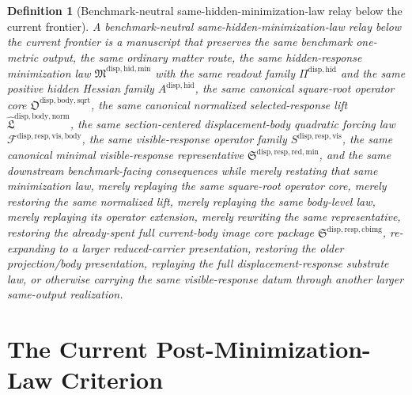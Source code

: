 \documentclass[11pt]{article}
\newcommand{\HiddenMinimizationPackage}{\mathfrak M^{\mathrm{disp,hid,min}}}
\newcommand{\SquareRootOperatorCore}{\mathfrak O^{\mathrm{disp,body,sqrt}}}
\newcommand{\NormalizedLiftPackage}{\widehat{\mathfrak L}^{\mathrm{disp,body,norm}}}
\newcommand{\VisibleBodyForcingLaw}{\mathscr F^{\mathrm{disp,resp,vis,body}}}
\newcommand{\VisibleResponseOperator}{S^{\mathrm{disp,resp,vis}}}
\newcommand{\MinimalReducedStructure}{\mathfrak S^{\mathrm{disp,resp,red,min}}}
\newcommand{\CurrentBodyImageCore}{\mathfrak S^{\mathrm{disp,resp,cbimg}}}
\newcommand{\HiddenReadout}{\Pi^{\mathrm{disp,hid}}}
\newcommand{\HiddenHessian}{A^{\mathrm{disp,hid}}}
\newtheorem{definition}{Definition}
\begin{document}
\begin{definition}[Benchmark-neutral same-hidden-minimization-law relay below the current frontier]
A \emph{benchmark-neutral same-hidden-minimization-law relay below the current frontier} is a manuscript that preserves the same benchmark one-metric output, the same ordinary matter route, the same hidden-response minimization law \(\HiddenMinimizationPackage\) with the same readout family \(\HiddenReadout\) and the same positive hidden Hessian family \(\HiddenHessian\), the same canonical square-root operator core \(\SquareRootOperatorCore\), the same canonical normalized selected-response lift \(\NormalizedLiftPackage\), the same section-centered displacement-body quadratic forcing law \(\VisibleBodyForcingLaw\), the same visible-response operator family \(\VisibleResponseOperator\), the same canonical minimal visible-response representative \(\MinimalReducedStructure\), and the same downstream benchmark-facing consequences while merely restating that same minimization law, merely replaying the same square-root operator core, merely restoring the same normalized lift, merely replaying the same body-level law, merely replaying its operator extension, merely rewriting the same representative, restoring the already-spent full current-body image core package \(\CurrentBodyImageCore\), re-expanding to a larger reduced-carrier presentation, restoring the older projection/body presentation, replaying the full displacement-response substrate law, or otherwise carrying the same visible-response datum through another larger same-output realization.
\end{definition}

\section{The Current Post-Minimization-Law Criterion}
\end{document}
